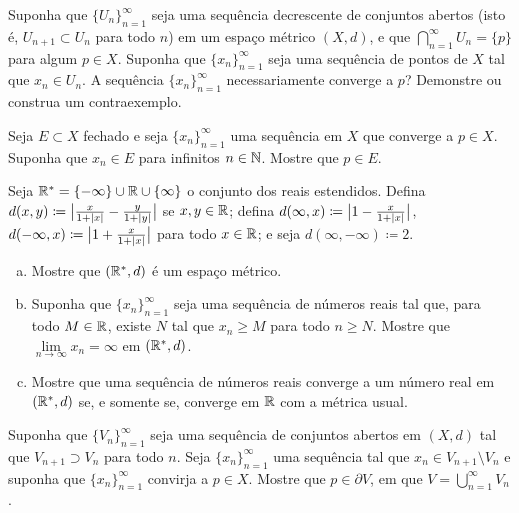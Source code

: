 \begin{exercise}[Desafio]
Suponha que $\{ U_n \}_{n=1}^\infty$ seja uma sequência decrescente de
conjuntos abertos (isto é, $U_{n+1} \subset U_n$ para
todo $n$) em um espaço métrico $(X,d)$, e que
$\bigcap_{n=1}^\infty U_n = \{ p \}$ para algum $p \in X$.
Suponha que $\{ x_n \}_{n=1}^\infty$ seja uma sequência de pontos de $X$
tal que $x_n \in U_n$. A sequência $\{ x_n \}_{n=1}^\infty$ necessariamente
converge a $p$? Demonstre ou construa um contraexemplo.
\end{exercise}

\begin{exercise}
Seja $E \subset X$ fechado e seja
$\{ x_n \}_{n=1}^\infty$ uma sequência em $X$ que converge a $p \in X$.
Suponha que $x_n \in E$ para infinitos $n \in {\mathbb{N}}$. Mostre que $p \in E$.
\end{exercise}

\begin{exercise} \label{exercise:extendedrealsmetric}
Seja ${\mathbb{R}}^* = \{ -\infty \} \cup {\mathbb{R}} \cup \{ \infty \}$ o conjunto dos reais
estendidos.
Defina
$d(x,y) \coloneqq \bigl\lvert { \frac{x}{1+\lvert {x} \rvert} - \frac{y}{1+\lvert {y} \rvert} } \bigr\rvert$
se $x,y \in {\mathbb{R}}$; defina
$d(\infty,x) \coloneqq \bigl\lvert { 1 - \frac{x}{1+\lvert {x} \rvert} } \bigr\rvert$,
$d(-\infty,x) \coloneqq \bigl\lvert { 1 + \frac{x}{1+\lvert {x} \rvert} } \bigr\rvert$
para todo $x \in {\mathbb{R}}$; e
seja $d(\infty,-\infty) \coloneqq 2$.
\begin{enumerate}[a)]
\item
Mostre que $({\mathbb{R}}^*,d)$ é um espaço métrico.
\item
Suponha que $\{ x_n \}_{n=1}^\infty$ seja uma sequência de números reais tal
que, para todo $M \in {\mathbb{R}}$, existe $N$ tal que
$x_n \geq M$ para todo $n \geq N$. Mostre que
$\lim\limits_{n\to\infty} x_n = \infty$ em
$({\mathbb{R}}^*,d)$.
\item
Mostre que uma sequência de números reais converge a um número real
em $({\mathbb{R}}^*,d)$ se, e somente se, converge em ${\mathbb{R}}$ com a métrica usual.
\end{enumerate}
\end{exercise}

\begin{exercise}
Suponha que $\{ V_n \}_{n=1}^\infty$ seja uma sequência de conjuntos abertos
em $(X,d)$
tal que $V_{n+1} \supset V_n$ para todo $n$. Seja $\{ x_n \}_{n=1}^\infty$
uma sequência
tal que $x_n \in V_{n+1} \setminus V_n$ e suponha que
$\{ x_n \}_{n=1}^\infty$ convirja a $p \in X$. Mostre que $p \in \partial V$,
em que $V = \bigcup_{n=1}^\infty V_n$.
\end{exercise}

